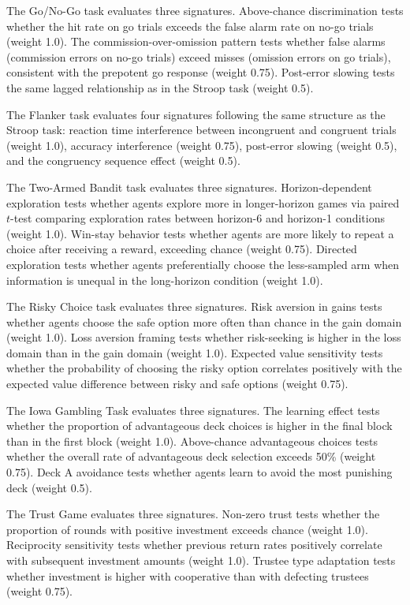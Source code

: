 The Go/No-Go task evaluates three signatures. Above-chance discrimination tests whether the hit rate on go trials exceeds the false alarm rate on no-go trials (weight 1.0). The commission-over-omission pattern tests whether false alarms (commission errors on no-go trials) exceed misses (omission errors on go trials), consistent with the prepotent go response (weight 0.75). Post-error slowing tests the same lagged relationship as in the Stroop task (weight 0.5).

The Flanker task evaluates four signatures following the same structure as the Stroop task: reaction time interference between incongruent and congruent trials (weight 1.0), accuracy interference (weight 0.75), post-error slowing (weight 0.5), and the congruency sequence effect (weight 0.5).

The Two-Armed Bandit task evaluates three signatures. Horizon-dependent exploration tests whether agents explore more in longer-horizon games via paired $t$-test comparing exploration rates between horizon-6 and horizon-1 conditions (weight 1.0). Win-stay behavior tests whether agents are more likely to repeat a choice after receiving a reward, exceeding chance (weight 0.75). Directed exploration tests whether agents preferentially choose the less-sampled arm when information is unequal in the long-horizon condition (weight 1.0).

The Risky Choice task evaluates three signatures. Risk aversion in gains tests whether agents choose the safe option more often than chance in the gain domain (weight 1.0). Loss aversion framing tests whether risk-seeking is higher in the loss domain than in the gain domain (weight 1.0). Expected value sensitivity tests whether the probability of choosing the risky option correlates positively with the expected value difference between risky and safe options (weight 0.75).

The Iowa Gambling Task evaluates three signatures. The learning effect tests whether the proportion of advantageous deck choices is higher in the final block than in the first block (weight 1.0). Above-chance advantageous choices tests whether the overall rate of advantageous deck selection exceeds 50\% (weight 0.75). Deck A avoidance tests whether agents learn to avoid the most punishing deck (weight 0.5).

The Trust Game evaluates three signatures. Non-zero trust tests whether the proportion of rounds with positive investment exceeds chance (weight 1.0). Reciprocity sensitivity tests whether previous return rates positively correlate with subsequent investment amounts (weight 1.0). Trustee type adaptation tests whether investment is higher with cooperative than with defecting trustees (weight 0.75).

